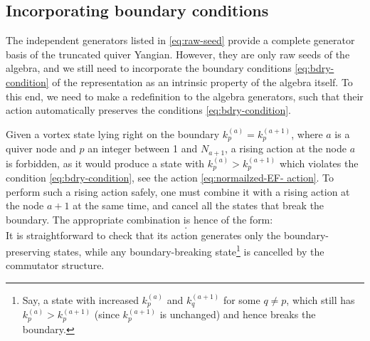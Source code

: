 \documentclass[12pt,a4paper]{article}
\begin{document}
\subsection{Incorporating boundary conditions}
\label{sec:bdry-adapted op}
The independent generators listed in \eqref{eq:raw-seed} provide a complete generator basis of the truncated quiver Yangian. However, they are only raw seeds of the algebra, and we still need to incorporate the boundary conditions \eqref{eq:bdry-condition} of the representation as an intrinsic property of the algebra itself. To this end, we need to make a redefinition to the algebra generators, such that their action automatically preserves the conditions \eqref{eq:bdry-condition}. 

Given a vortex state lying right on the boundary $k^{(a)}_p=k^{(a+1)}_p$, where $a$ is a quiver node and $p$ an integer between 1 and $N_{a+1}$, a rising action at the node $a$ is forbidden, as it would produce a state with $k^{(a)}_p>k^{(a+1)}_p$ which violates the condition \eqref{eq:bdry-condition}, see the action \eqref{eq:normailzed-EF- action}. To perform such a rising action safely, one must combine it with a rising action at the node $a+1$ at the same time, and cancel all the states that break the boundary. The appropriate combination is hence of the form:
\begin{equation}
    [E^{(a)}_n,E^{(a+1)}_m]\,.
\end{equation}
It is straightforward to check that its action generates only the boundary-preserving states, while any boundary-breaking state\footnote{Say, a state with increased $k^{(a)}_p$ and $k^{(a+1)}_q$ for some $q\neq p$, which still has $k^{(a)}_p>k^{(a+1)}_p$ (since $k^{(a+1)}_p$ is unchanged) and hence breaks the boundary.} is cancelled by the commutator structure. 

\medskip
\end{document}
